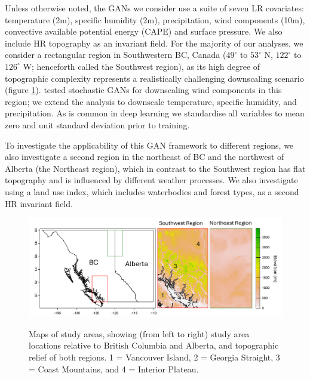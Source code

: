 \documentclass{ametsocV6.1}
\begin{document}
Unless otherwise noted, the GANs we consider use a suite of seven LR covariates: temperature (2m), specific humidity (2m), precipitation, wind components (10m), convective available potential energy (CAPE) and surface pressure. We also include HR topography as an invariant field. For the majority of our analyses, we consider a rectangular region in Southwestern BC, Canada ($49^\circ$ to $53^\circ$ N, $122^\circ$ to $126^\circ$ W; henceforth called the Southwest region), as its high degree of topographic complexity represents a realistically challenging downscaling scenario (figure \ref{studyarea}). \citet{daust2024capturing} tested stochastic GANs for downscaling wind components in this region; we extend the analysis to downscale temperature, specific humidity, and precipitation. As is common in deep learning we standardise all variables to mean zero and unit standard deviation prior to training. 

To investigate the applicability of this GAN framework to different regions, we also investigate a second region in the northeast of BC and the northwest of Alberta (the Northeast region), which in contrast to the Southwest region has flat topography and is influenced by different weather processes. We also investigate using a land use index, which includes waterbodies and forest types, as a second HR invariant field.

\begin{figure}[H]
  \noindent\includegraphics[width=\textwidth,angle=0]{final/StudyAreas.png}\\
  \caption{Maps of study areas, showing (from left to right) study area locations relative to British Columbia and Alberta, and topographic relief of both regions. 1 = Vancouver Island, 2 = Georgia Straight, 3 = Coast Mountains, and 4 = Interior Plateau.}\label{studyarea}
\end{figure}
\end{document}
